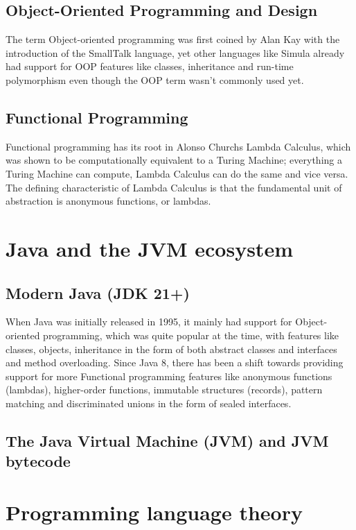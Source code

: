\subsection{Object-Oriented Programming and Design}

The term Object-oriented programming was first coined by Alan Kay with the introduction of
the SmallTalk language, yet other languages like Simula already had support for OOP features
like classes, inheritance and run-time polymorphism even though the OOP term wasn't commonly
used yet.

\subsection{Functional Programming}

Functional programming has its root in Alonso Churchs Lambda Calculus, which was shown to
be computationally equivalent to a Turing Machine; everything a Turing Machine can compute, 
Lambda Calculus can do the same and vice versa. The defining characteristic of Lambda 
Calculus is that the fundamental unit of abstraction is anonymous functions, or lambdas. 

\section{Java and the JVM ecosystem}

\subsection{Modern Java (JDK 21+)}

When Java was initially released in 1995, it mainly had support for Object-oriented 
programming, which was quite popular at the time, with features like classes, objects, 
inheritance in the form of both abstract classes and interfaces and method overloading.
Since Java 8, there has been a shift towards providing support for more Functional 
programming features like anonymous functions (lambdas), higher-order functions, immutable
structures (records), pattern matching and discriminated unions in the form of sealed 
interfaces. 

\subsection{The Java Virtual Machine (JVM) and JVM bytecode}

\section{Programming language theory}

